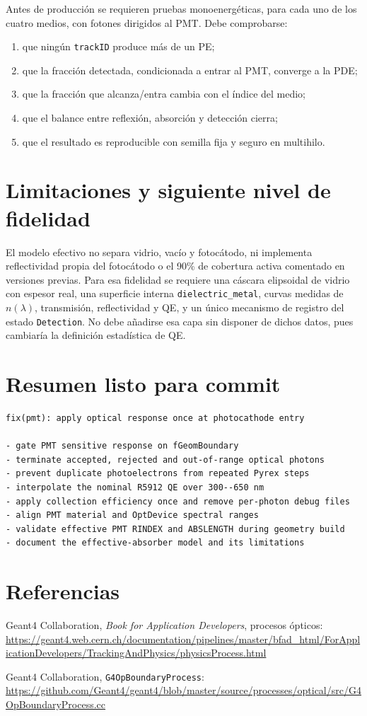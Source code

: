\documentclass[11pt,a4paper]{article}
\begin{document}
Antes de producción se requieren pruebas monoenergéticas, para cada uno de los
cuatro medios, con fotones dirigidos al PMT. Debe comprobarse:
\begin{enumerate}
\item que ningún \texttt{trackID} produce más de un PE;
\item que la fracción detectada, condicionada a entrar al PMT, converge a la PDE;
\item que la fracción que alcanza/entra cambia con el índice del medio;
\item que el balance entre reflexión, absorción y detección cierra;
\item que el resultado es reproducible con semilla fija y seguro en multihilo.
\end{enumerate}

\section{Limitaciones y siguiente nivel de fidelidad}
El modelo efectivo no separa vidrio, vacío y fotocátodo, ni implementa
reflectividad propia del fotocátodo o el 90\% de cobertura activa comentado en
versiones previas. Para esa fidelidad se requiere una cáscara elipsoidal de
vidrio con espesor real, una superficie interna \texttt{dielectric\_metal},
curvas medidas de $n(\lambda)$, transmisión, reflectividad y QE, y un único
mecanismo de registro del estado \texttt{Detection}. No debe añadirse esa capa
sin disponer de dichos datos, pues cambiaría la definición estadística de QE.

\section{Resumen listo para commit}
\begin{lstlisting}
fix(pmt): apply optical response once at photocathode entry

- gate PMT sensitive response on fGeomBoundary
- terminate accepted, rejected and out-of-range optical photons
- prevent duplicate photoelectrons from repeated Pyrex steps
- interpolate the nominal R5912 QE over 300--650 nm
- apply collection efficiency once and remove per-photon debug files
- align PMT material and OptDevice spectral ranges
- validate effective PMT RINDEX and ABSLENGTH during geometry build
- document the effective-absorber model and its limitations
\end{lstlisting}

\section{Referencias}
Geant4 Collaboration, \emph{Book for Application Developers}, procesos ópticos:
\url{https://geant4.web.cern.ch/documentation/pipelines/master/bfad_html/ForApplicationDevelopers/TrackingAndPhysics/physicsProcess.html}

Geant4 Collaboration, \texttt{G4OpBoundaryProcess}:
\url{https://github.com/Geant4/geant4/blob/master/source/processes/optical/src/G4OpBoundaryProcess.cc}
\end{document}
